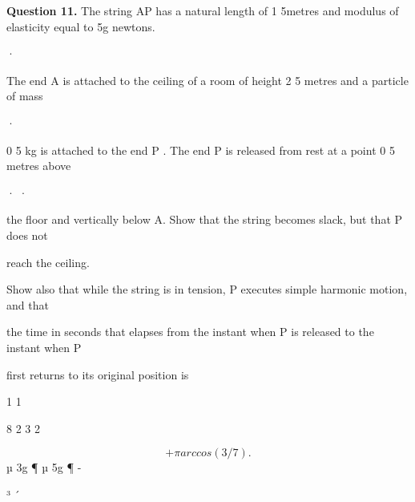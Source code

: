 \documentclass[12pt]{article}
\begin{document}
\begin{flushleft}
\bigskip\textbf{Question 11.} The string AP has a natural length of 1 5metres and modulus of elasticity equal to 5g newtons.\par
·\par
The end A is attached to the ceiling of a room of height 2 5 metres and a particle of mass\par
·\par
0 5 kg is attached to the end P . The end P is released from rest at a point 0 5 metres above\par
· ·\par
the floor and vertically below A. Show that the string becomes slack, but that P does not\par
reach the ceiling.\par
Show also that while the string is in tension, P executes simple harmonic motion, and that\par
the time in seconds that elapses from the instant when P is released to the instant when P\par
first returns to its original position is\par
1 1\par
8 2 3 2\par
\[+ \pi arccos(3/7) .\]
µ 3g ¶ µ 5g ¶ -\par
³ ´\par
[Note that arccos x is another notation for cos\par
-1\par
x.]\par
\end{flushleft}
\end{document}
